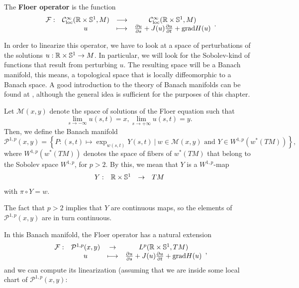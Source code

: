 \begin{deff} \label{deff:floer_operator}
The {\bf Floer operator} is the function
\[\begin{array}{rccc} \mathcal{F} : & \mathcal{C}^{\infty}_{\mathrm{loc}}(\mathbb{R}\times\mathbb{S}^1,M) & \longrightarrow & \mathcal{C}^{\infty}_{\mathrm{loc}}(\mathbb{R}\times\mathbb{S}^1,M) \\ & u & \longmapsto & \frac{\partial u}{\partial s} + J(u) \frac{\partial u}{\partial t} + \mathrm{grad} H (u) \end{array} .\]
\end{deff}

In order to linearize this operator, we have to look at a space of perturbations of the solutions $u : \mathbb{R} \times \mathbb{S}^1 \rightarrow M$. In particular, we will look for the Sobolev-kind of functions that result from perturbing $u$. The resulting space will be a Banach manifold, this means, a topological space that is locally diffeomorphic to a Banach space. A good introduction to the theory of Banach manifolds can be found at \cite{abraham2012manifolds}, although the general idea is sufficient for the purposes of this chapter.

\begin{deff}
Let $\mathcal{M}(x,y)$ denote the space of solutions of the Floer equation such that
\[\lim_{s \rightarrow -\infty} u(s,t) = x, \lim_{s \rightarrow +\infty} u(s,t) = y.\]
Then, we define the Banach manifold
\[\mathcal{P}^{1,p}(x,y) = \left\{P : (s,t) \mapsto \exp_{w(s,t)}Y(s,t) \ | \ w \in \mathcal{M}(x,y) \text{ and } Y \in W^{1,p}(w^{\ast}(TM))\right\} ,\]
where $W^{1,p}(w^{\ast}(TM))$ denotes the space of fibers of $w^{\ast}(TM)$ that belong to the Sobolev space $W^{1,p}$, for $p > 2$. By this, we mean that $Y$ is a $W^{1,p}$-map
\[\begin{array}{rccc} Y : & \mathbb{R} \times \mathbb{S}^1 & \rightarrow & TM \end{array}\]
with $\pi \circ Y = w$.
\end{deff}

\begin{rmrk}
The fact that $p > 2$ implies that $Y$ are continuous maps, so the elements of $\mathcal{P}^{1,p}(x,y)$ are in turn continuous.
\end{rmrk}

In this Banach manifold, the Floer operator has a natural extension
\[\begin{array}{rccc} \mathcal{F} : & \mathcal{P}^{1,p}(x,y) & \rightarrow & L^p(\mathbb{R} \times \mathbb{S}^1, TM) \\ & u & \longmapsto & \frac{\partial u}{\partial s} + J(u)\frac{\partial u}{\partial t} + \mathrm{grad} H(u) \end{array} ,\]
and we can compute its linearization (assuming that we are inside some local chart of $\mathcal{P}^{1,p}(x,y)$:

